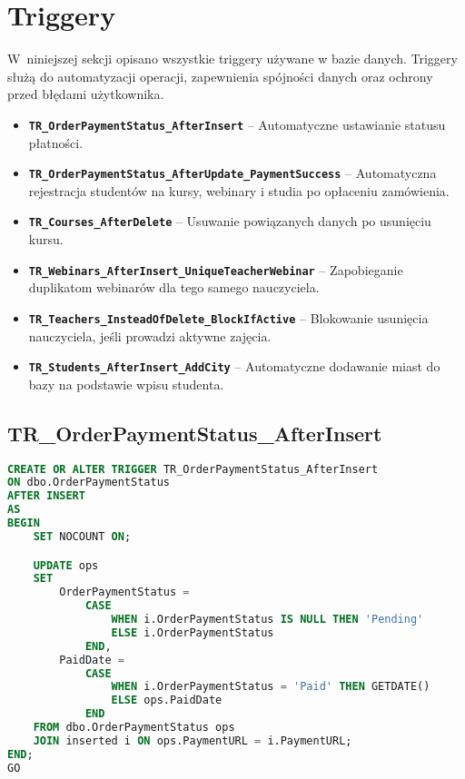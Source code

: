 \documentclass[12pt]{article}
\begin{document}
\newpage
\section{Triggery}
\label{sec:triggery}

W~niniejszej sekcji opisano wszystkie triggery używane w bazie danych. Triggery służą do 
automatyzacji operacji, zapewnienia spójności danych oraz ochrony przed błędami użytkownika.

\begin{itemize}
    \item \textbf{\texttt{TR\_OrderPaymentStatus\_AfterInsert}}  
          – Automatyczne ustawianie statusu płatności.
    \item \textbf{\texttt{TR\_OrderPaymentStatus\_AfterUpdate\_PaymentSuccess}}  
          – Automatyczna rejestracja studentów na kursy, webinary i studia po opłaceniu zamówienia.
    \item \textbf{\texttt{TR\_Courses\_AfterDelete}}  
          – Usuwanie powiązanych danych po usunięciu kursu.
    \item \textbf{\texttt{TR\_Webinars\_AfterInsert\_UniqueTeacherWebinar}}  
          – Zapobieganie duplikatom webinarów dla tego samego nauczyciela.
    \item \textbf{\texttt{TR\_Teachers\_InsteadOfDelete\_BlockIfActive}}  
          – Blokowanie usunięcia nauczyciela, jeśli prowadzi aktywne zajęcia.
    \item \textbf{\texttt{TR\_Students\_AfterInsert\_AddCity}}  
          – Automatyczne dodawanie miast do bazy na podstawie wpisu studenta.
\end{itemize}

\subsection{TR\_OrderPaymentStatus\_AfterInsert}
\begin{lstlisting}[language=SQL]
CREATE OR ALTER TRIGGER TR_OrderPaymentStatus_AfterInsert
ON dbo.OrderPaymentStatus
AFTER INSERT
AS
BEGIN
    SET NOCOUNT ON;

    UPDATE ops
    SET
        OrderPaymentStatus =
            CASE
                WHEN i.OrderPaymentStatus IS NULL THEN 'Pending'
                ELSE i.OrderPaymentStatus
            END,
        PaidDate =
            CASE
                WHEN i.OrderPaymentStatus = 'Paid' THEN GETDATE()
                ELSE ops.PaidDate
            END
    FROM dbo.OrderPaymentStatus ops
    JOIN inserted i ON ops.PaymentURL = i.PaymentURL;
END;
GO
\end{lstlisting}
\end{document}

